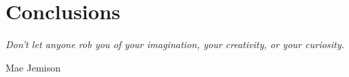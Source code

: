 \chapter*{Conclusions}
\epigraph{\emph{Don't let anyone rob you of your imagination, your creativity, or your curiosity.}} {Mae Jemison}





